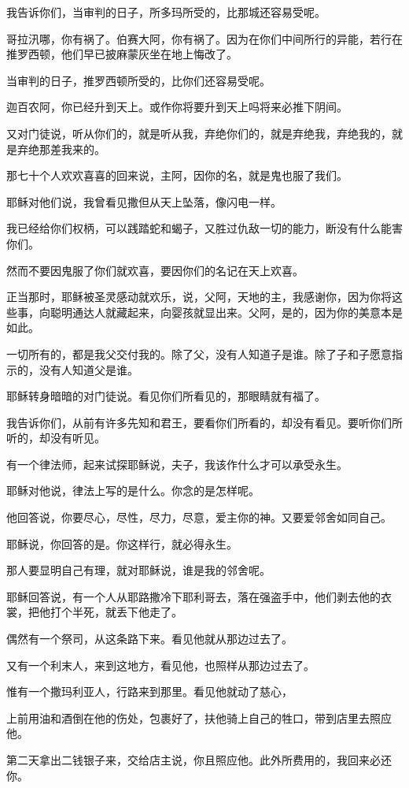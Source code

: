 \documentclass[12pt,oneside]{book}
\begin{document}
我告诉你们，当审判的日子，所多玛所受的，比那城还容易受呢。

哥拉汛哪，你有祸了。伯赛大阿，你有祸了。因为在你们中间所行的异能，若行在推罗西顿，他们早已披麻蒙灰坐在地上悔改了。

当审判的日子，推罗西顿所受的，比你们还容易受呢。

迦百农阿，你已经升到天上。或作你将要升到天上吗将来必推下阴间。

又对门徒说，听从你们的，就是听从我，弃绝你们的，就是弃绝我，弃绝我的，就是弃绝那差我来的。

那七十个人欢欢喜喜的回来说，主阿，因你的名，就是鬼也服了我们。

耶稣对他们说，我曾看见撒但从天上坠落，像闪电一样。

我已经给你们权柄，可以践踏蛇和蝎子，又胜过仇敌一切的能力，断没有什么能害你们。

然而不要因鬼服了你们就欢喜，要因你们的名记在天上欢喜。

正当那时，耶稣被圣灵感动就欢乐，说，父阿，天地的主，我感谢你，因为你将这些事，向聪明通达人就藏起来，向婴孩就显出来。父阿，是的，因为你的美意本是如此。

一切所有的，都是我父交付我的。除了父，没有人知道子是谁。除了子和子愿意指示的，没有人知道父是谁。

耶稣转身暗暗的对门徒说。看见你们所看见的，那眼睛就有福了。

我告诉你们，从前有许多先知和君王，要看你们所看的，却没有看见。要听你们所听的，却没有听见。

有一个律法师，起来试探耶稣说，夫子，我该作什么才可以承受永生。

耶稣对他说，律法上写的是什么。你念的是怎样呢。

他回答说，你要尽心，尽性，尽力，尽意，爱主你的神。又要爱邻舍如同自己。

耶稣说，你回答的是。你这样行，就必得永生。

那人要显明自己有理，就对耶稣说，谁是我的邻舍呢。

耶稣回答说，有一个人从耶路撒冷下耶利哥去，落在强盗手中，他们剥去他的衣裳，把他打个半死，就丢下他走了。

偶然有一个祭司，从这条路下来。看见他就从那边过去了。

又有一个利末人，来到这地方，看见他，也照样从那边过去了。

惟有一个撒玛利亚人，行路来到那里。看见他就动了慈心，

上前用油和酒倒在他的伤处，包裹好了，扶他骑上自己的牲口，带到店里去照应他。

第二天拿出二钱银子来，交给店主说，你且照应他。此外所费用的，我回来必还你。
\end{document}
